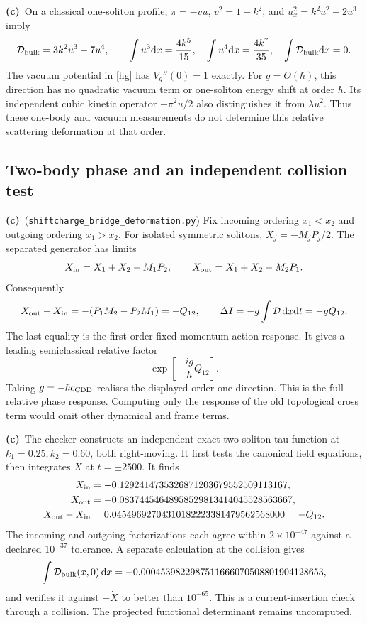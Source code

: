 \documentclass[11pt,a4paper]{article}
\newcommand{\C}{\textbf{(c)}\ }
\newcommand{\dd}{\mathrm d}
\newcommand{\file}[1]{\nolinkurl{#1}}
\newcommand{\df}{\file{shiftcharge_bridge_deformation.py}}
\begin{document}
\C On a classical one-soliton profile,
$\pi=-vu$, $v^2=1-k^2$, and $u_x^2=k^2u^2-2u^3$ imply
\begin{equation}
 {\cal D}_{\rm bulk}=3k^2u^3-7u^4,\qquad
 \int u^3\dd x=\frac{4k^5}{15},\quad
 \int u^4\dd x=\frac{4k^7}{35},\quad
 \int{\cal D}_{\rm bulk}\dd x=0 .
 \label{onebody-zero}
\end{equation}
The vacuum potential in \eqref{hg} has $V_g''(0)=1$ exactly.
For $g=O(\hbar)$, this direction has no quadratic vacuum term or
one-soliton energy shift at order $\hbar$. Its independent cubic kinetic
operator $-\pi^2u/2$ also distinguishes it from $\lambda u^2$.
Thus these one-body and vacuum measurements do not determine this
relative scattering deformation at that order.

\subsection{Two-body phase and an independent collision test}
\C (\df) Fix incoming ordering $x_1<x_2$ and outgoing ordering
$x_1>x_2$. For isolated symmetric solitons,
$X_j=-M_jP_j/2$. The separated generator has limits
\begin{equation}
 X_{\rm in}=X_1+X_2-M_1P_2,\qquad
 X_{\rm out}=X_1+X_2-M_2P_1 .
\end{equation}
Consequently
\begin{equation}
 X_{\rm out}-X_{\rm in}
 =-(P_1M_2-P_2M_1)=-Q_{12},\qquad
 \Delta I=-g\int{\cal D}\,\dd x\dd t=-gQ_{12}.
 \label{action-shift}
\end{equation}
The last equality is the first-order fixed-momentum action response.
It gives a leading semiclassical relative factor
\begin{equation}
 \exp\left[-\frac{ig}{\hbar}Q_{12}\right].
 \label{relative-factor}
\end{equation}
Taking $g=-\hbar c_{\rm CDD}$ realises the displayed order-one direction.
This is the full relative phase response. Computing only the response of
the old topological cross term would omit other dynamical and frame terms.

\C The checker constructs an independent exact two-soliton tau function
at $k_1=0.25,k_2=0.60$, both right-moving. It first tests the canonical field
equations, then integrates $X$ at $t=\pm2500$. It finds
\begin{align}
 X_{\rm in}&=-0.1292414735326871203679552509113167,\nonumber\\
 X_{\rm out}&=-0.08374454648958529813414045528563667,\nonumber\\
 X_{\rm out}-X_{\rm in}
 &=0.04549692704310182223381479562568000=-Q_{12}.
\end{align}
The incoming and outgoing factorizations each agree within $2\times10^{-47}$
against a declared $10^{-37}$ tolerance. A separate calculation at the
collision gives
\begin{equation}
 \int{\cal D}_{\rm bulk}(x,0)\,\dd x
 =-0.0004539822987511666070508801904128653,
\end{equation}
and verifies it against $-\dot X$ to better than $10^{-65}$.
This is a current-insertion check through a collision. The projected
functional determinant remains uncomputed.
\end{document}
